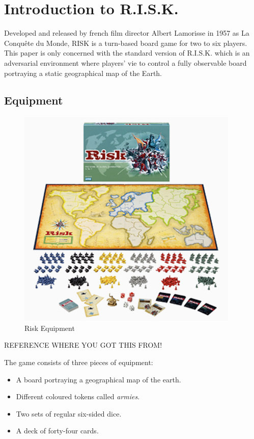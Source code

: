 \documentclass[parskip]{cs4rep}
\begin{document}
\newpage

\section{Introduction to R.I.S.K.}

Developed and released by french film director Albert Lamorisse in 1957 as La Conqu\^ete du Monde, RISK is a turn-based board game for two to six players. This paper is only concerned with the standard version of R.I.S.K. which is an adversarial environment where players' vie to control a fully observable board portraying a static geographical map of the Earth.

\subsection{Equipment}

\begin{figure}[h]
\centering
\includegraphics{images/risk-board}
\caption{Risk Equipment}
\label{fig:risk-equipment}
\end{figure}

REFERENCE WHERE YOU GOT THIS FROM!

The game consists of three pieces of equipment:

\begin{itemize}
\item
A board portraying a geographical map of the earth.
\item
Different coloured tokens called \textit{armies}.
\item
Two sets of regular six-sided dice.
\item
A deck of forty-four cards.
\end{itemize}
\end{document}
